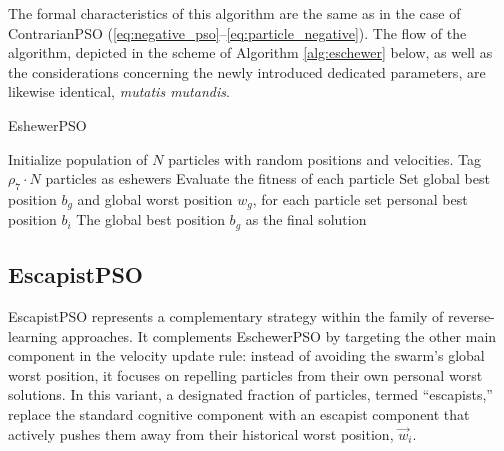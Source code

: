 {The formal characteristics of this algorithm are the same as in the case of ContrarianPSO (\ref{eq:negative_pso}--\ref{eq:particle_negative}). The flow of the algorithm, depicted in the scheme of Algorithm \ref{alg:eschewer} below, as well as the considerations concerning the newly introduced dedicated parameters, are likewise identical, \textit{mutatis mutandis}.

\vspace{.535em}
\begin{algorithm}[H]
\caption{EshewerPSO}\label{alg:eschewer}
Initialize population of \(N\) particles with random positions and velocities. Tag \(\rho_7 \cdot N\) particles as eshewers\;
Evaluate the fitness of each particle\;
Set global best position \(b_g\) and global worst position \(w_g\), for each particle set personal best position \(b_i\)\;
\Return The global best position \(b_g\) as the final solution\;
\end{algorithm}









\enlargethispage{.1\baselineskip}
\subsection{EscapistPSO}

EscapistPSO represents a complementary strategy within the family of reverse-learning approaches. It complements EschewerPSO by targeting the other main component in the velocity update rule: instead of avoiding the swarm’s global worst position, it focuses on repelling particles from their own personal worst solutions. In this variant, a designated fraction of particles, termed ``escapists,'' replace the standard cognitive component with an escapist component that actively pushes them away from their historical worst position, $\vec{w}_i$.

}
